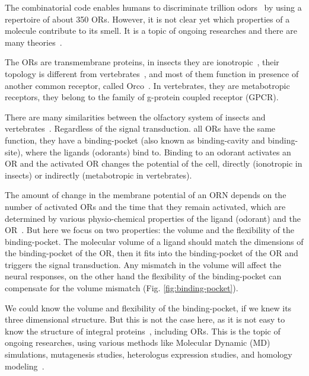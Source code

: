 \documentclass[11pt]{paper} %
\begin{document}
The combinatorial code enables humans to discriminate trillion odors~\cite{Bushdid2014} by using a repertoire of about 350 ORs.
However, it is not clear yet which properties of a molecule contribute to its smell. 
It is a topic of ongoing researches and there are many theories~\cite{Turin,Keller2004,Araneda2000,Brookes2007,Franco2011,Pelz2006,Gabler2013,Schmuker2007,Haddad2008,Snitz2013,Yablonka2012,gane2013}.

The ORs are transmembrane proteins, 
in insects they are ionotropic~\cite{Sato2008,Wicher2008,Nagel2011,Rong2011}, 
their topology is different from vertebrates~\cite{Benton2006,Smart2008},
and most of them function in presence of another common receptor, called Orco~\cite{Larsson2004}.
In vertebrates, they are metabotropic receptors, they belong to the family of g-protein coupled receptor (GPCR). 

There are many similarities between the olfactory system of insects and vertebrates~\cite{Wilson2014,Kaupp2010}.
Regardless of the signal transduction.
all ORs have the same function, they have a binding-pocket (also known as binding-cavity and binding-site),
where the ligands (odorants) bind to. 
Binding to an odorant activates an OR and 
the activated OR changes the potential of the cell, 
directly (ionotropic in insects) or indirectly (metabotropic in vertebrates).


The amount of change in the membrane potential of an ORN depends on the number of activated ORs and the time that they remain activated,
which are determined by various physio-chemical properties of the ligand (odorant) and the OR~\cite{Turin,Araneda2000,Gabler2013,guerrieri2005,uchida2000}. 
But here we focus on two properties: the volume and the flexibility of the binding-pocket.
The molecular volume of a ligand should match the dimensions of the binding-pocket of the OR,
then it fits into the binding-pocket of the OR and triggers the signal transduction. 
Any mismatch in the volume will affect the neural responses, 
on the other hand the flexibility of the binding-pocket can compensate for the volume mismatch (Fig. \ref{fig:binding-pocket}).

We could know the volume and flexibility of the binding-pocket, 
if we knew its three dimensional structure.
But this is not the case here, 
as it is not easy to know the structure of integral proteins~\cite{Zhang2008,Lupieri2009}, 
including ORs. 
This is the topic of ongoing researches, 
using various methods like Molecular Dynamic (MD) simulations, 
mutagenesis studies, heterologus expression studies, and homology modeling~\cite{Khafizov2007,Man2004,Lai2005,Vaidehi2002,Floriano2004,Schmiedeberg2007,Katada2005,Kato2008,Rospars2013}.
\end{document}
